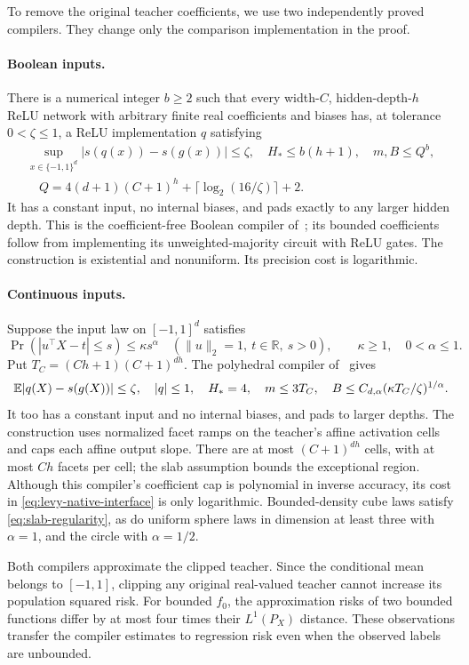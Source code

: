 To remove the original teacher coefficients, we use two independently proved compilers. They change only the comparison implementation in the proof.

\paragraph{Boolean inputs.}
There is a numerical integer $b\ge2$ such that every width-$C$, hidden-depth-$h$ ReLU network with arbitrary finite real coefficients and biases has, at tolerance $0<\zeta\le1$, a ReLU implementation $q$ satisfying
\begin{equation}
 \begin{gathered}
 \sup_{x\in\{-1,1\}^d}|s(q(x))-s(g(x))|\le\zeta,
 \quad H_*\le b(h+1),\quad m,B\le Q^b,\\
 \quad Q=4(d+1)(C+1)^h+\lceil\log_2(16/\zeta)\rceil+2.
 \end{gathered}
 \label{eq:Boolean-compiler}
\end{equation}
It has a constant input, no internal biases, and pads exactly to any larger hidden depth. This is the coefficient-free Boolean compiler of~\cite{boolean}; its bounded coefficients follow from implementing its unweighted-majority circuit with ReLU gates. The construction is existential and nonuniform. Its precision cost is logarithmic.

\paragraph{Continuous inputs.}
Suppose the input law on $[-1,1]^d$ satisfies
\begin{equation}
 \Pr(|u^\top X-t|\le s)\le\kappa s^\alpha
 \quad(\|u\|_2=1,\ t\in\mathbb R,\ s>0),
 \qquad\kappa\ge1,\quad0<\alpha\le1.
 \label{eq:slab-regularity}
\end{equation}
Put $T_C=(Ch+1)(C+1)^{dh}$. The polyhedral compiler of~\cite{regular} gives
\begin{equation}
 \mathbb E|q(X)-s(g(X))|\le\zeta,
 \quad |q|\le1,\quad H_*=4,\quad
 m\le3T_C,\quad
 B\le C_{d,\alpha}(\kappa T_C/\zeta)^{1/\alpha}.
 \label{eq:continuous-compiler}
\end{equation}
It too has a constant input and no internal biases, and pads to larger depths. The construction uses normalized facet ramps on the teacher's affine activation cells and caps each affine output slope. There are at most $(C+1)^{dh}$ cells, with at most $Ch$ facets per cell; the slab assumption bounds the exceptional region. Although this compiler's coefficient cap is polynomial in inverse accuracy, its cost in \eqref{eq:levy-native-interface} is only logarithmic. Bounded-density cube laws satisfy \eqref{eq:slab-regularity}, as do uniform sphere laws in dimension at least three with $\alpha=1$, and the circle with $\alpha=1/2$.

Both compilers approximate the clipped teacher. Since the conditional mean belongs to $[-1,1]$, clipping any original real-valued teacher cannot increase its population squared risk. For bounded $f_0$, the approximation risks of two bounded functions differ by at most four times their $L^1(P_X)$ distance. These observations transfer the compiler estimates to regression risk even when the observed labels are unbounded.
